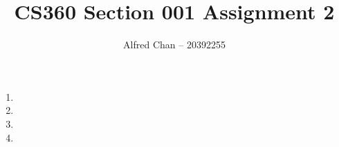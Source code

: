 \documentclass[12pt]{article}
\title{CS360 Section 001 Assignment 2}
\author{Alfred Chan -- 20392255}
\begin{document}
\maketitle

\begin{enumerate}
\item
\item
\item
\item
\end{enumerate}
\end{document}
